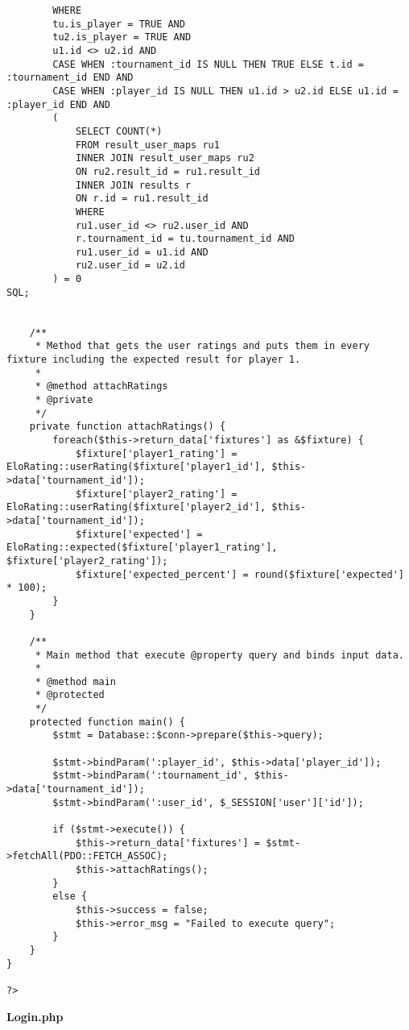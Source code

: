 {\begin{lstlisting}
		WHERE
		tu.is_player = TRUE AND
		tu2.is_player = TRUE AND
		u1.id <> u2.id AND
		CASE WHEN :tournament_id IS NULL THEN TRUE ELSE t.id = :tournament_id END AND
		CASE WHEN :player_id IS NULL THEN u1.id > u2.id ELSE u1.id = :player_id END AND
		(
			SELECT COUNT(*)
			FROM result_user_maps ru1
			INNER JOIN result_user_maps ru2
			ON ru2.result_id = ru1.result_id
			INNER JOIN results r
			ON r.id = ru1.result_id
			WHERE
			ru1.user_id <> ru2.user_id AND
			r.tournament_id = tu.tournament_id AND
			ru1.user_id = u1.id AND
			ru2.user_id = u2.id
		) = 0
SQL;


	/**
	 * Method that gets the user ratings and puts them in every fixture including the expected result for player 1.
	 *
	 * @method attachRatings
	 * @private
	 */
	private function attachRatings() {
		foreach($this->return_data['fixtures'] as &$fixture) {
			$fixture['player1_rating'] = EloRating::userRating($fixture['player1_id'], $this->data['tournament_id']);
			$fixture['player2_rating'] = EloRating::userRating($fixture['player2_id'], $this->data['tournament_id']);
			$fixture['expected'] = EloRating::expected($fixture['player1_rating'], $fixture['player2_rating']);
			$fixture['expected_percent'] = round($fixture['expected'] * 100);
		}
	}

	/**
	 * Main method that execute @property query and binds input data.
	 *
	 * @method main
	 * @protected
	 */
	protected function main() {
		$stmt = Database::$conn->prepare($this->query);

		$stmt->bindParam(':player_id', $this->data['player_id']);
		$stmt->bindParam(':tournament_id', $this->data['tournament_id']);
		$stmt->bindParam(':user_id', $_SESSION['user']['id']);

		if ($stmt->execute()) {
			$this->return_data['fixtures'] = $stmt->fetchAll(PDO::FETCH_ASSOC);
			$this->attachRatings();
		}
		else {
			$this->success = false;
			$this->error_msg = "Failed to execute query";
		}
	}
}

?>\end{lstlisting}
}
\textbf{Login.php}

